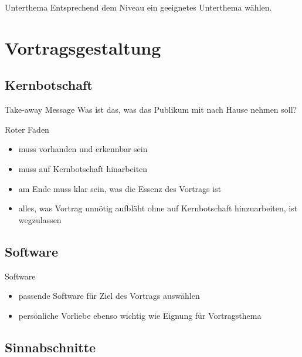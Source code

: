 \documentclass{beamer}
\begin{document}
    \begin{frame}{Unterthema}
        \centering
        Entsprechend dem Niveau ein geeignetes Unterthema wählen.
    \end{frame}

\section{Vortragsgestaltung}
    
    \subsection{Kernbotschaft}

    \begin{frame}{Take-away Message}
        \centering
        Was ist das, was das Publikum mit nach Hause nehmen soll?
    \end{frame}

    \begin{frame}{Roter Faden}
        \begin{itemize}
            \item muss vorhanden und erkennbar sein
            \item muss auf Kernbotschaft hinarbeiten
            \item am Ende muss klar sein, was die Essenz des Vortrags ist
            \item alles, was Vortrag unnötig aufbläht ohne auf Kernbotschaft hinzuarbeiten, ist wegzulassen
        \end{itemize}
    \end{frame}
    
    \subsection{Software}

    \begin{frame}{Software}
        \begin{itemize}
            \item passende Software für Ziel des Vortrags auswählen
            \item persönliche Vorliebe ebenso wichtig wie Eignung für Vortragsthema
        \end{itemize}
    \end{frame}

    \subsection{Sinnabschnitte}
\end{document}

